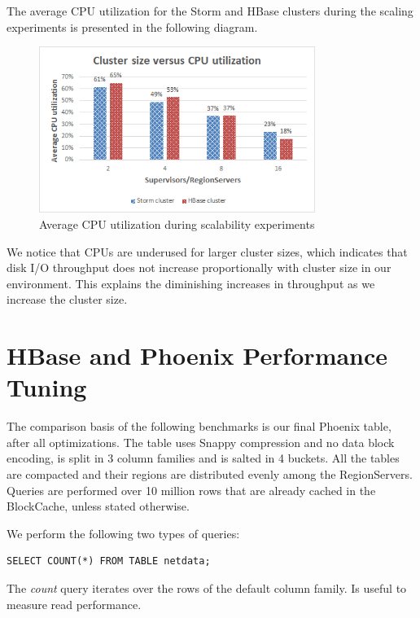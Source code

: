 The average CPU utilization for the Storm and HBase clusters during the scaling experiments is presented in the following diagram.

\begin{figure}[H]
\centering
\includegraphics[width=0.8\textwidth]{figures/benchmarks_storm_scalability_cpu}
\caption{Average CPU utilization during scalability experiments}
\label{figure:benchmarks_storm_scalability_cpu}
\end{figure}

We notice that CPUs are underused for larger cluster sizes, which indicates that disk I/O throughput does not increase proportionally with cluster size in our environment. This explains the diminishing increases in throughput as we increase the cluster size.


\section{HBase and Phoenix Performance Tuning}

The comparison basis of the following benchmarks is our final Phoenix table, after all optimizations. The table uses Snappy compression and no data block encoding, is split in 3 column families and is salted in 4 buckets. All the tables are compacted and their regions are distributed evenly among the RegionServers. Queries are performed over 10 million rows that are already cached in the BlockCache, unless stated otherwise.

We perform the following two types of queries:

\begin{lstlisting}[language=PhoenixSQL]
SELECT COUNT(*) FROM TABLE netdata;
\end{lstlisting}

The \emph{count} query iterates over the rows of the default column family. Is useful to measure read performance.

